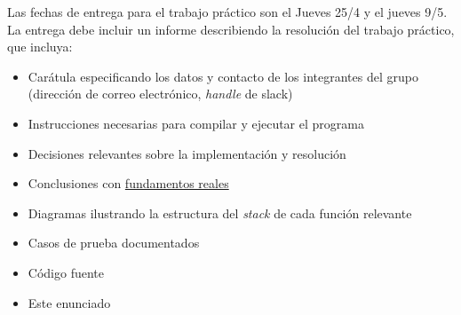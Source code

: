 \documentclass{article}
\begin{document}
Las fechas de entrega para el trabajo práctico son el Jueves 25/4 y el jueves 9/5. La entrega debe incluir un informe
describiendo la resolución del trabajo práctico, que incluya:

\begin{itemize}
\item Carátula especificando los datos y contacto de los integrantes del grupo (dirección de correo electrónico, \textit{handle} de slack)
\item Instrucciones necesarias para compilar y ejecutar el programa
\item Decisiones relevantes sobre la implementación y resolución
\item Conclusiones con \underline{fundamentos reales}
\item Diagramas ilustrando la estructura del \textit{stack} de cada función relevante
\item Casos de prueba documentados
\item Código fuente
\item Este enunciado
\end{itemize}
\end{document}
